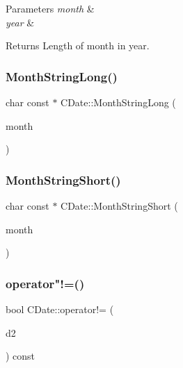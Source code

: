 \begin{DoxyParams}{Parameters}
{\em month} & \\
\hline
{\em year} & \\
\hline
\end{DoxyParams}
\begin{DoxyReturn}{Returns}
Length of month in year. 
\end{DoxyReturn}
\mbox{\label{class_c_date_ae5b1a9098f964ba2243e6dd542f43891}} 
\subsubsection{\texorpdfstring{Month\+String\+Long()}{MonthStringLong()}}
{\footnotesize\ttfamily char const  $\ast$ C\+Date\+::\+Month\+String\+Long (\begin{DoxyParamCaption}\item[{int}]{month }\end{DoxyParamCaption})\hspace{0.3cm}{\ttfamily [static]}}

\mbox{\label{class_c_date_a4dc10a16bb273faf61c896c71f3f50de}} 
\subsubsection{\texorpdfstring{Month\+String\+Short()}{MonthStringShort()}}
{\footnotesize\ttfamily char const  $\ast$ C\+Date\+::\+Month\+String\+Short (\begin{DoxyParamCaption}\item[{int}]{month }\end{DoxyParamCaption})\hspace{0.3cm}{\ttfamily [static]}}

\mbox{\label{class_c_date_a6f4dd69ce64b0fa9e654e55d54ead67d}} 
\subsubsection{\texorpdfstring{operator"!=()}{operator!=()}}
{\footnotesize\ttfamily bool C\+Date\+::operator!= (\begin{DoxyParamCaption}\item[{const \mbox{\hyperlink{class_c_date}{C\+Date}} \&}]{d2 }\end{DoxyParamCaption}) const\hspace{0.3cm}{\ttfamily [inline]}}

